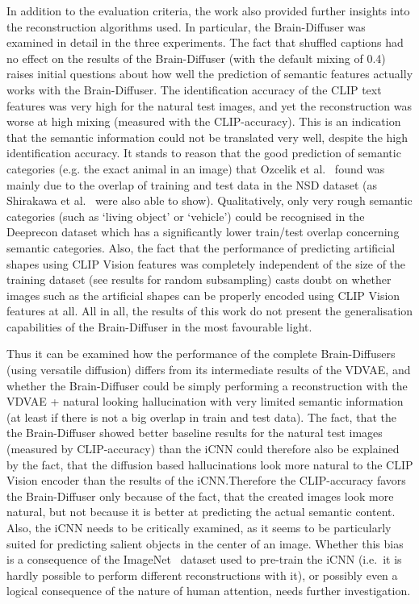 In addition to the evaluation criteria, the work also provided further insights into the reconstruction algorithms used. In particular, the Brain-Diffuser was examined in detail in the three experiments. The fact that shuffled captions had no effect on the results of the Brain-Diffuser (with the default mixing of 0.4) raises initial questions about how well the prediction of semantic features actually works with the Brain-Diffuser. The identification accuracy of the CLIP text features was very high for the natural test images, and yet the reconstruction was worse at high mixing (measured with the CLIP-accuracy). This is an indication that the semantic information could not be translated very well, despite the high identification accuracy. It stands to reason that the good prediction of semantic categories (e.g. the exact animal in an image) that Ozcelik et al.~\cite{ozcelikNaturalSceneReconstruction2023} found was mainly due to the overlap of training and test data in the NSD dataset (as Shirakawa et al.~\cite{shirakawaSpuriousReconstructionBrain2024} were also able to show). Qualitatively, only very rough semantic categories (such as `living object' or `vehicle') could be recognised in the Deeprecon dataset which has a significantly lower train/test overlap concerning semantic categories. Also, the fact that the performance of predicting artificial shapes using CLIP Vision features was completely independent of the size of the training dataset (see results for random subsampling) casts doubt on whether images such as the artificial shapes can be properly encoded using CLIP Vision features at all. All in all, the results of this work do not present the generalisation capabilities of the Brain-Diffuser in the most favourable light. 


 Thus it can be examined how the performance of the complete Brain-Diffusers (using versatile diffusion) differs from its intermediate results of the VDVAE, and whether the Brain-Diffuser could be simply performing a reconstruction with the VDVAE + natural looking hallucination with very limited semantic information (at least if there is not a big overlap in train and test data). The fact, that the the Brain-Diffuser showed better baseline results for the natural test images (measured by CLIP-accuracy) than the iCNN could therefore also be explained by the fact, that the diffusion based hallucinations look more natural to the CLIP Vision encoder than the results of the iCNN.\@ Therefore the CLIP-accuracy favors the Brain-Diffuser only because of the fact, that the created images look more natural, but not because it is better at predicting the actual semantic content. Also, the iCNN needs to be critically examined, as it seems to be particularly suited for predicting salient objects in the center of an image. Whether this bias is a consequence of the ImageNet~\cite{dengImageNetLargescaleHierarchical2009} dataset used to pre-train the iCNN (i.e.\ it is hardly possible to perform different reconstructions with it), or possibly even a logical consequence of the nature of human attention, needs further investigation.


